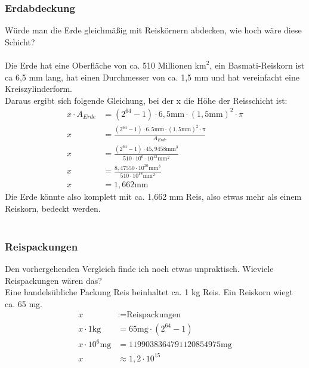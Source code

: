 \documentclass[a4paper,9pt]{scrartcl}
\begin{document}
  \subsubsection{Erdabdeckung}
    Würde man die Erde gleichmäßig mit Reiskörnern abdecken, wie hoch wäre diese
    Schicht?\\
    \\
    Die Erde hat eine Oberfläche von ca. 510 Millionen $\text{km}^2$, ein Basmati-Reiskorn
    ist ca 6,5 mm lang, hat einen Durchmesser von ca. 1,5 mm und hat vereinfacht
    eine Kreiszylinderform.\\
    Daraus ergibt sich folgende Gleichung, bei der x die Höhe der Reisschicht
    ist:\\
    \begin{align}
        x \cdot A_{Erde} &= (2^{64}-1) \cdot 6,5\text{mm} \cdot (1,5\text{mm})^2 \cdot \pi \\
        x &= \frac{(2^{64}-1) \cdot 6,5\text{mm} \cdot (1,5\text{mm})^2 \cdot \pi}{A_{Erde}} \\
        x &= \frac{(2^{64}-1) \cdot 45,9458\text{mm}^3}{510 \cdot 10^6 \cdot 10^{12} \text{mm}^2} \\
        x &= \frac{8,47550 \cdot 10^{20} \text{mm}^3}{510 \cdot 10^{18} \text{mm}^2} \\
        x &= 1,662\text{mm}
    \end{align}
    Die Erde könnte also komplett mit ca. 1,662 mm Reis, also etwas mehr als
    einem Reiskorn, bedeckt werden.\\
    \\
    \subsubsection{Reispackungen}
    Den vorhergehenden Vergleich finde ich noch etwas unpraktisch. Wieviele Reispackungen
    wären das? \\
    Eine handelsübliche Packung Reis beinhaltet ca. 1 kg Reis. Ein Reiskorn
    wiegt ca. 65 mg.\\
    \begin{align}
        x &:= \text{Reispackungen} \\
        x \cdot 1\text{kg}     &= 65\text{mg} \cdot (2^{64}-1) \\
        x \cdot 10^6\text{mg} &= 1199038364791120854975\text{mg} \\
        x &\approx 1,2 \cdot 10^{15}
    \end{align}
\end{document}
